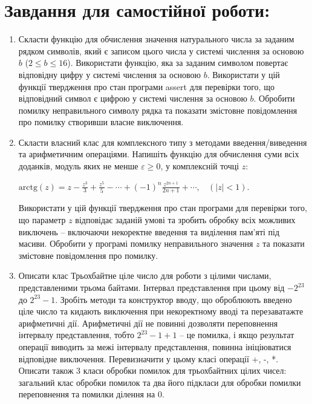 \documentclass[a5paper,titlepage,openany,twoside,draft]{book_unv}%
\begin{document}
\section{Завдання для самостійної роботи:}
\begin{enumerate}
\def\labelenumi{\arabic{enumi})}
\setcounter{enumi}{2}
\item
Скласти функцію для обчислення значення натурального
числа за заданим рядком символів, який є записом цього числа у системі
числення за основою $b$ (\(2 \leq b \leq 16\)). Використати функцію, яка
за заданим символом повертає відповідну цифру у системі числення за
основою $b$. Використати у цій функції твердження про стан програми assert
для перевірки того, що відповідний символ є цифрою у системі числення за
основою $b$. Обробити помилку неправильного символу рядка та
показати змістовне повідомлення про помилку створивши власне виключення.

\item
Скласти власний клас для комплексного типу з методами введення/виведення 
та арифметичним операціями. Напишіть функцію для обчислення суми всіх доданків, модуль
яких не менше $\varepsilon \ge 0$, у комплексній точці $z$:

\(\text{arctg}\left( z \right) = z - \frac{z^{3}}{3} + \frac{z^{5}}{5} - \cdots + {(-1)}^{n}\frac{z^{2n+1}}{2n + 1} + \cdots,\ \ \ \ (\left| z \right| < 1)\).

Використати у цій функції твердження про стан програми для перевірки
того, що параметр $z$ відповідає заданій умові та зробить обробку
всіх можливих виключень -- включаючи некоректне введення та виділення
пам'яті під масиви. Обробити у програмі помилку неправильного значення
$z$ та показати змістовне повідомлення про помилку.

\item
Описати клас Трьохбайтне ціле число для роботи з цілими числами,
представленими трьома байтами. Інтервал представлення при цьому від
$-2^{23}$ до $2^{23}-1$. 
Зробіть методи та конструктор вводу, що оброблюють введено ціле число
та кидають виключення при некоректному вводі та перезаватажте арифметичні дії. 
Арифметичні дії не повинні дозволяти переповнення інтервалу представлення, 
тобто $2^{23}-1 + 1$ -- це помилка, і якщо результат операції виводить
 за межі інтервалу представлення, повинна
ініціюватися відповідне виключення. 
Перевизначити у цьому класі операції +, -, *.
Описати також 3 класи обробки помилок для трьохбайтних цілих чисел:
загальний клас обробки помилок та два його підкласи для обробки помилки
переповнення та помилки ділення на 0.


\end{enumerate}
\end{document}
